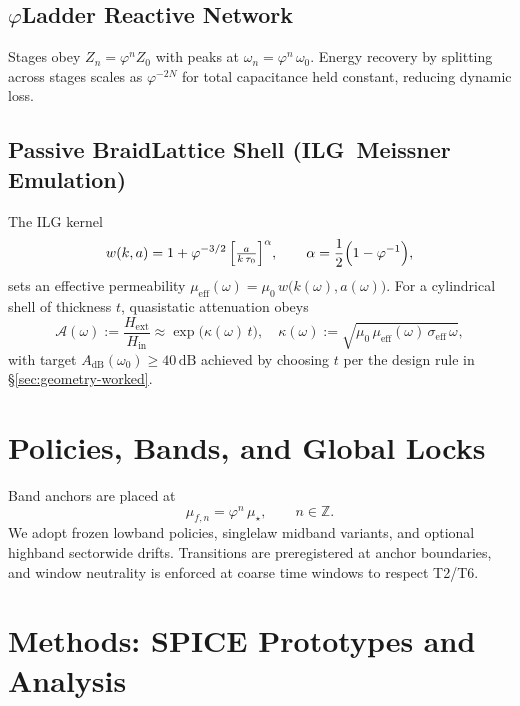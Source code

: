 \documentclass[11pt,a4paper]{article}
\newcommand{\ZZ}{\mathbb{Z}}
\newcommand{\mus}{\mu_{\star}}
\newcommand{\ILG}{\textsc{ILG}}
\begin{document}
\subsection{\texorpdfstring{$\varphi$}{phi}\textendash Ladder Reactive Network}
Stages obey \(Z_n = \varphi^n Z_0\) with peaks at \(\omega_n=\varphi^n\,\omega_0\). Energy recovery by splitting across stages scales as \(\varphi^{-2N}\) for total capacitance held constant, reducing dynamic loss.

\subsection{Passive Braid\textendash Lattice Shell (\ILG\ Meissner Emulation)}
The ILG kernel
\begin{equation}
  w(k,a) = 1 + \varphi^{-3/2}\,\Bigl[\tfrac{a}{k\,\tau_0}\Bigr]^{\alpha},\qquad \alpha = \frac{1}{2}\Bigl(1-\varphi^{-1}\Bigr),\label{eq:ilg}
\end{equation}
sets an effective permeability \(\mu_{\mathrm{eff}}(\omega)=\mu_0\,w\bigl(k(\omega),a(\omega)\bigr)\). For a cylindrical shell of thickness \(t\), quasi\textendash static attenuation obeys
\begin{equation}
  \mathcal{A}(\omega) := \frac{H_{\mathrm{ext}}}{H_{\mathrm{in}}} \approx \exp\!\bigl(\kappa(\omega)\,t\bigr),\quad \kappa(\omega) := \sqrt{\mu_0\,\mu_{\mathrm{eff}}(\omega)\,\sigma_{\mathrm{eff}}\,\omega},\label{eq:atten}
\end{equation}
with target \(A_{\mathrm{dB}}(\omega_0)\ge 40\,\mathrm{dB}\) achieved by choosing \(t\) per the design rule in \S\ref{sec:geometry-worked}.

\section{Policies, Bands, and Global Locks}
\label{sec:bands}
Band anchors are placed at
\begin{equation}
  \mu_{f,n} = \varphi^{n}\,\mus,\qquad n\in\ZZ.\label{eq:bandanchors}
\end{equation}
We adopt frozen low\textendash band policies, single\textendash law mid\textendash band variants, and optional high\textendash band sector\textendash wide drifts. Transitions are pre\textendash registered at anchor boundaries, and window neutrality is enforced at coarse time windows to respect T2/T6.

\section{Methods: SPICE Prototypes and Analysis}
\label{sec:methods}
\end{document}
